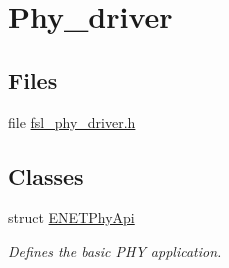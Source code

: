 \hypertarget{group__phy__driver}{}\section{Phy\+\_\+driver}
\label{group__phy__driver}
\subsection*{Files}
\begin{DoxyCompactItemize}
\item 
file \hyperlink{fsl__phy__driver_8h}{fsl\+\_\+phy\+\_\+driver.\+h}
\end{DoxyCompactItemize}
\subsection*{Classes}
\begin{DoxyCompactItemize}
\item 
struct \hyperlink{structENETPhyApi}{E\+N\+E\+T\+Phy\+Api}
\begin{DoxyCompactList}\small\item\em Defines the basic P\+HY application. \end{DoxyCompactList}\end{DoxyCompactItemize}
